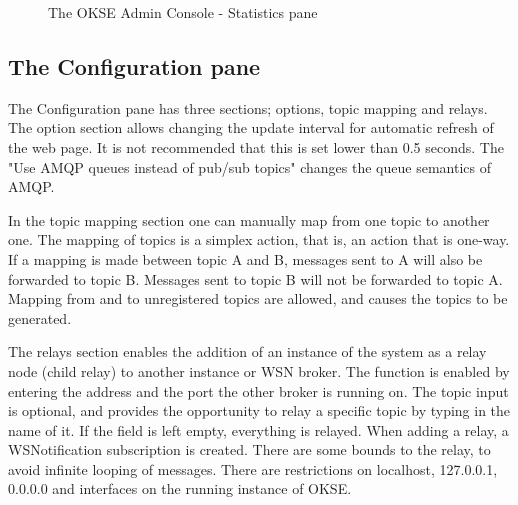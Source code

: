 \begin{center}
  \begin{figure}[ht!]
    \caption{The OKSE Admin Console - Statistics pane} 
    \label{fig:OKSE Admin Console - Statistics pane}
  \end{figure}
\end{center}

\subsection{The Configuration pane}
The Configuration pane has three sections; options, topic mapping and relays. The option section allows changing the update interval for automatic refresh of the web page. It is not recommended that this is set lower than 0.5 seconds. The "Use AMQP queues instead of pub/sub topics" changes the queue semantics of AMQP.

In the topic mapping section one can manually map from one topic to another one. The mapping of topics is a simplex action, that is, an action that is one-way. If a mapping is made between topic A and B, messages sent to A will also be forwarded to topic B. Messages sent to topic B will not be forwarded to topic A. Mapping from and to unregistered topics are allowed, and causes the topics to be generated.

The relays section enables the addition of an instance of the system as a relay node (child relay) to another instance or WSN broker. The function is enabled by entering the address and the port the other broker is running on. The topic input is optional, and provides the opportunity to relay a specific topic by typing in the name of it. If the field is left empty, everything is relayed. When adding a relay, a WSNotification subscription is created. There are some bounds to the relay, to avoid infinite looping of messages. There are restrictions on localhost, 127.0.0.1, 0.0.0.0 and interfaces on the running instance of OKSE.


